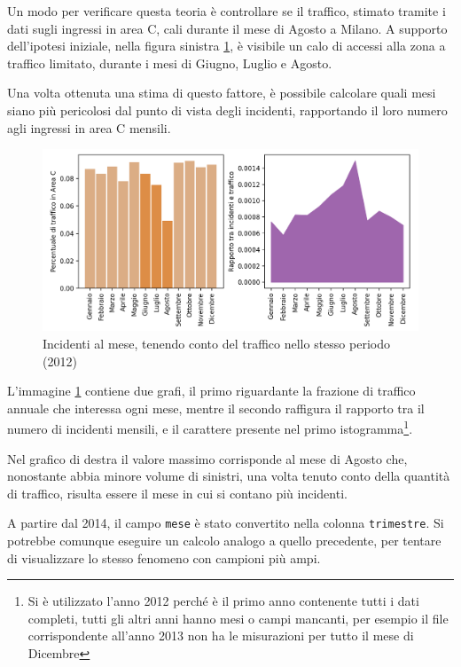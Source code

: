 \documentclass[a4paper,12pt]{report}
\newcommand{\columnstyle}[1]{\texttt{#1}}
\newcommand{\skipline}{\vspace{0.2in}}
\begin{document}
Un modo per verificare questa teoria è controllare se il traffico, 
stimato tramite i dati sugli ingressi in area C, cali durante il mese di 
Agosto a Milano. 
A supporto dell'ipotesi iniziale, nella figura sinistra \ref{fig:incidenti-traffico-mese}, 
è visibile un calo di accessi alla zona a traffico limitato, 
durante i mesi di Giugno, Luglio e Agosto. 

Una volta ottenuta una stima di questo fattore, è possibile calcolare quali mesi 
siano più pericolosi dal punto di vista degli incidenti, 
rapportando il loro numero agli ingressi in area C mensili.

\begin{figure}
    \includegraphics[width=\linewidth]{../src/area_c/rapporto_mese.png}
    \caption{Incidenti al mese, tenendo conto del traffico nello stesso periodo (2012)}
    \label{fig:incidenti-traffico-mese}
\end{figure}

L'immagine \ref{fig:incidenti-traffico-mese} contiene due grafi, 
il primo riguardante la frazione di traffico annuale che interessa ogni mese, 
mentre il secondo raffigura il rapporto tra il numero di incidenti mensili, 
e il carattere presente nel primo
istogramma\footnote{Si è utilizzato l'anno 2012 perché è il primo anno contenente 
tutti i dati completi, tutti gli altri anni hanno mesi o campi mancanti, 
per esempio il file corrispondente all'anno 
2013 non ha le misurazioni per tutto il mese di Dicembre}. 

Nel grafico di destra il valore massimo corrisponde al mese di Agosto 
che, nonostante abbia minore volume di sinistri, 
una volta tenuto conto della quantità di traffico, risulta essere 
il mese in cui si contano più incidenti. 

\skipline
A partire dal 2014, il campo \columnstyle{mese} è stato convertito nella 
colonna \columnstyle{trimestre}. 
Si potrebbe comunque eseguire un calcolo analogo a quello precedente, 
per tentare di visualizzare lo stesso fenomeno con campioni più ampi. 
\end{document}
